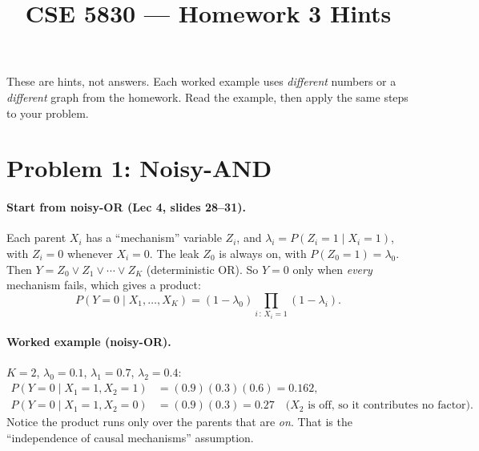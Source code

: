 \documentclass[11pt]{article}
\title{CSE 5830 --- Homework 3 Hints}
\author{}
\date{}
\begin{document}
\maketitle

These are hints, not answers. Each worked example uses \emph{different}
numbers or a \emph{different} graph from the homework. Read the example, then
apply the same steps to your problem.

\section*{Problem 1: Noisy-AND}

\paragraph{Start from noisy-OR (Lec 4, slides 28--31).}
Each parent $X_i$ has a ``mechanism'' variable $Z_i$, and
$\lambda_i = P(Z_i = 1 \mid X_i = 1)$, with $Z_i = 0$ whenever $X_i = 0$.
The leak $Z_0$ is always on, with $P(Z_0 = 1) = \lambda_0$. Then
$Y = Z_0 \lor Z_1 \lor \cdots \lor Z_K$ (deterministic OR). So $Y = 0$ only
when \emph{every} mechanism fails, which gives a product:
\[
  P(Y = 0 \mid X_1,\dots,X_K) = (1-\lambda_0) \prod_{i \,:\, X_i = 1} (1-\lambda_i).
\]

\paragraph{Worked example (noisy-OR).}
$K=2$, $\lambda_0 = 0.1$, $\lambda_1 = 0.7$, $\lambda_2 = 0.4$:
\begin{align*}
  P(Y=0 \mid X_1=1, X_2=1) &= (0.9)(0.3)(0.6) = 0.162, \\
  P(Y=0 \mid X_1=1, X_2=0) &= (0.9)(0.3) = 0.27 \quad
    \text{($X_2$ is off, so it contributes no factor).}
\end{align*}
Notice the product runs only over the parents that are \emph{on}. That is
the ``independence of causal mechanisms'' assumption.
\end{document}
